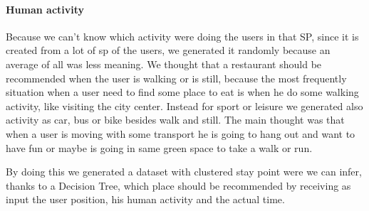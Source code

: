 \documentclass[../../main]{subfiles}
\begin{document}
\paragraph{Human activity}
Because we can't know which activity were doing the users in that SP, since it is created from a lot of sp of the users, we generated it randomly 
because an average of all was less meaning. We thought that a restaurant should be recommended when the user is walking or is still, because
the most frequently situation when a user need to find some place to eat is when he do some walking activity, like visiting the city center.
Instead for sport or leisure we generated also activity as car, bus or bike besides walk and still. The main thought was that when a user is moving with 
some transport he is going to hang out and want to have fun or maybe is going in same green space to take a walk or run.

By doing this we generated a dataset with clustered stay point were we can infer, thanks to a Decision Tree, which place should be recommended by 
receiving as input the user position, his human activity and the actual time.
\end{document}
